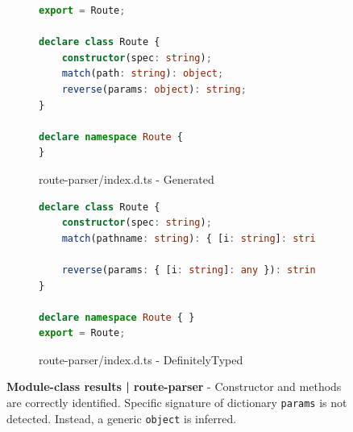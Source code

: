 \documentclass[a4paper,english,cleveref, autoref]{lipics-v2019}
\begin{document}
\begin{figure}[tp]
    \centering
    \begin{subfigure}{0.48\linewidth}
      \begin{lstlisting}[language=TypeScript]
export = Route;

declare class Route {
    constructor(spec: string);
    match(path: string): object;
    reverse(params: object): string;
}

declare namespace Route {
}
      \end{lstlisting}
      \caption{route-parser/index.d.ts - Generated}
    \end{subfigure}
    \hfill
    \begin{subfigure}{0.48\linewidth}
      \begin{lstlisting}[language=TypeScript]
declare class Route {
    constructor(spec: string);
    match(pathname: string): { [i: string]: string } | false;

    reverse(params: { [i: string]: any }): string | false;
}

declare namespace Route { }
export = Route;       
      \end{lstlisting}
      \caption{route-parser/index.d.ts - DefinitelyTyped}
    \end{subfigure}

    \caption{\textbf{Module-class results | route-parser} - Constructor and methods are correctly identified. Specific signature of dictionary \lstinline{params} is not detected. Instead, a generic \lstinline{object} is inferred.}
    \label{fig:experiments-results-module-class-route-parser}
\end{figure}
\end{document}
